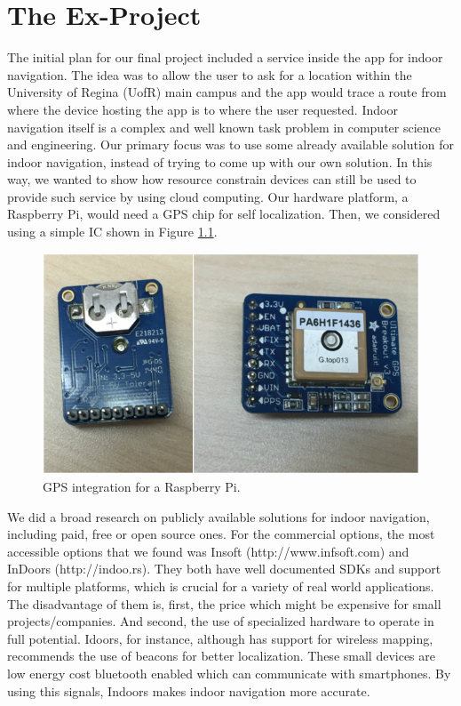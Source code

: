 \chapter{The Ex-Project}
\label{sec:ex-project}


The initial plan for our final project included a service inside the app for indoor navigation.
The idea was to allow the user to ask for a location within the University of Regina (UofR) main campus and the app would trace a route from where the device hosting the app is to where the user requested.
Indoor navigation itself is a complex and well known task problem in computer science and engineering.
Our primary focus was to use some already available solution for indoor navigation, instead of trying to come up with our own solution.
In this way, we wanted to show how resource constrain devices can still be used to provide such service by using cloud computing.
Our hardware platform, a Raspberry Pi, would need a GPS chip for self localization.
Then, we considered using a simple IC shown in Figure \ref{fig:console}.

\begin{figure}
\label{fig:console}
\centerline{
\includegraphics[width=\textwidth]{figures/chip_gps.png}
}
\caption{GPS integration for a Raspberry Pi.}
\end{figure}

We did a broad research on publicly available solutions for indoor navigation, including paid, free or open source ones.
For the commercial options, the most accessible options that we found was Insoft (http://www.infsoft.com) and InDoors (http://indoo.rs).
They both have well documented SDKs and support for multiple platforms, which is crucial for a variety of real world applications.
The disadvantage of them is, first, the price which might be expensive for small projects/companies. And second, the use of specialized hardware to operate in full potential.
Idoors, for instance, although has support for wireless mapping, recommends the use of beacons for better localization.
These small devices are low energy cost bluetooth enabled which can communicate with smartphones.
By using this signals, Indoors makes indoor navigation more accurate.

